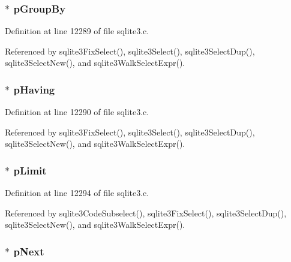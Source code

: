 \subsubsection[{p\+Group\+By}]{$\ast$ p\+Group\+By}\label{struct_select_ab73f489b26450bf7c199d78c93092cea}


Definition at line 12289 of file sqlite3.\+c.



Referenced by sqlite3\+Fix\+Select(), sqlite3\+Select(), sqlite3\+Select\+Dup(), sqlite3\+Select\+New(), and sqlite3\+Walk\+Select\+Expr().

\hypertarget{struct_select_afc7e0bb89d63e1b2ca12d2d083ab7d05}{}
\subsubsection[{p\+Having}]{$\ast$ p\+Having}\label{struct_select_afc7e0bb89d63e1b2ca12d2d083ab7d05}


Definition at line 12290 of file sqlite3.\+c.



Referenced by sqlite3\+Fix\+Select(), sqlite3\+Select(), sqlite3\+Select\+Dup(), sqlite3\+Select\+New(), and sqlite3\+Walk\+Select\+Expr().

\hypertarget{struct_select_a343fcdf61b7e033a4d8cb1f3484e8002}{}
\subsubsection[{p\+Limit}]{$\ast$ p\+Limit}\label{struct_select_a343fcdf61b7e033a4d8cb1f3484e8002}


Definition at line 12294 of file sqlite3.\+c.



Referenced by sqlite3\+Code\+Subselect(), sqlite3\+Fix\+Select(), sqlite3\+Select\+Dup(), sqlite3\+Select\+New(), and sqlite3\+Walk\+Select\+Expr().

\hypertarget{struct_select_aac48b00813a5c8f3392f9ab6cc0c260e}{}
\subsubsection[{p\+Next}]{$\ast$ p\+Next}\label{struct_select_aac48b00813a5c8f3392f9ab6cc0c260e}


